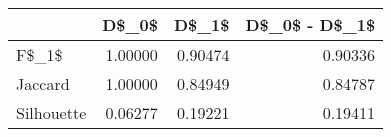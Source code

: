 \begin{table}
\centering
\caption{}
\label{}
\begin{tabular}{lrrr}
\toprule
{} &   D\$\_0\$ &   D\$\_1\$ &  D\$\_0\$ - D\$\_1\$ \\
\midrule
F\$\_1\$      & 1.00000 & 0.90474 &        0.90336 \\
Jaccard    & 1.00000 & 0.84949 &        0.84787 \\
Silhouette & 0.06277 & 0.19221 &        0.19411 \\
\bottomrule
\end{tabular}
\end{table}
